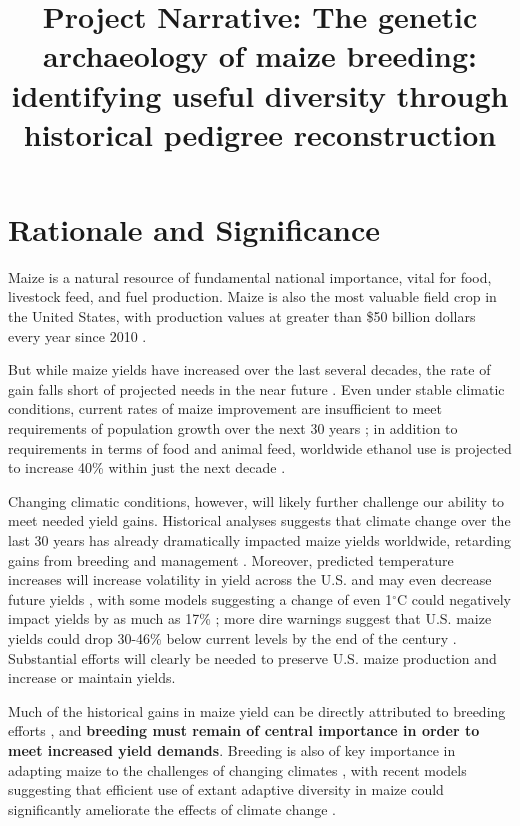 \documentclass[12pt]{article}
\begin{document}
\title{Project Narrative: The genetic archaeology of maize breeding: identifying useful diversity through historical pedigree reconstruction}
\author{}
\date{}
\maketitle

\section*{Rationale and Significance}
\label{sec:rationale}

Maize is a natural resource of fundamental national importance, vital for food, livestock feed, and fuel production.
Maize is also the most valuable field crop in the United States, with production values at greater than \$50 billion dollars every year since 2010 \citep{usdanass}. 

But while maize yields have increased over the last several decades, the rate of gain falls short of projected needs in the near future \citep{grassini2013distinguishing}.
Even under stable climatic conditions, current rates of maize improvement are insufficient to meet requirements of population growth over the next 30 years \citep{ray2013yield}; in  addition to requirements in terms of food and animal feed, worldwide ethanol use is projected to increase 40\% within just the next decade \citep{usdalong}.

Changing climatic conditions, however, will likely further challenge our ability to meet needed yield gains. 
Historical analyses suggests that climate change over the last 30 years has already dramatically impacted maize yields worldwide, retarding gains from breeding and management \citep{Lobell2011}.
Moreover, predicted temperature increases will increase volatility in yield across the U.S. and may even decrease future yields \citep{urban2012projected}, with some models suggesting a change of even 1$^{\circ}$C could negatively impact yields by as much as 17\% \citep{lobell2003climate}; more dire warnings suggest that U.S. maize yields could drop 30-46\% below current levels by the end of the century \citep{schlenker2009nonlinear}.
Substantial efforts will clearly be needed to preserve U.S. maize production and increase or maintain yields.  

Much of the historical gains in maize yield can be directly attributed to breeding efforts \citep{Duvick1992, duvick2005genetic}, and {\bf breeding must remain of central importance in order to meet increased yield demands}.  
Breeding is also of key importance in adapting maize to the challenges of changing climates \citep{Troyer2004a}, with recent models suggesting that efficient use of extant adaptive diversity in maize could significantly ameliorate the effects of climate change \citep{butler2013adaptation}.   
\end{document}
